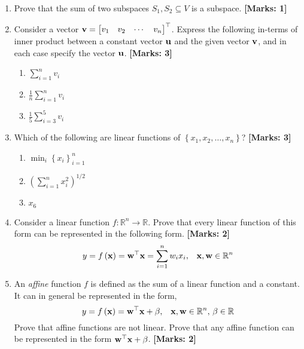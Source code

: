 \documentclass[12pt]{article}
\def\mf{\ensuremath\mathbf}
\begin{document}
\begin{enumerate}
    \item Prove that the sum of two subspaces $S_1, S_2 \subseteq V$ is a subspace. \textbf{[Marks: 1]}
    
    \item Consider a vector $\mf{v} = \begin{bmatrix*}v_1 & v_2 & \cdots & v_n\end{bmatrix*}^\top$. Express the following in-terms of inner product between a constant vector $\mf{u}$ and the given vector $\mf{v}$, and in each case specify the vector $\mf{u}$. \textbf{[Marks: 3]}
    \begin{enumerate}
        \item $\sum_{i=1}^n v_i$
        \item $\frac{1}{n}\sum_{i=1}^n v_i$
        \item $\frac{1}{5}\sum_{i=3}^5 v_i$
    \end{enumerate} 
    
    \item Which of the following are linear functions of $\left\{x_1, x_2, \ldots,x_n\right\}$? \textbf{[Marks: 3]}
    \begin{enumerate}
        \item $\min_i \left\{x_i\right\}_{i=1}^{n}$
        \item $\left(\sum_{i=1}^n x_i^2\right)^{1/2}$
        \item $x_6$
    \end{enumerate}
    
    \item Consider a linear function $f: \mathbb{R}^n \rightarrow \mathbb{R}$. Prove that every linear function of this form can be represented in the following form. \textbf{[Marks: 2]}
    \[ y = f\left(\mf{x}\right) = \mf{w}^\top\mf{x} = \sum_{i=1}^{n}w_ix_i, \,\,\,\,\, \mf{x}, \mf{w} \in \mathbb{R}^n \]

    \item An \textit{affine} function $f$ is defined as the sum of a linear function and a constant. It can in general be represented in the form, 
    \[ y = f\left(\mf{x}\right) = \mf{w}^\top\mf{x} + \beta, \,\,\,\,\, \mf{x}, \mf{w} \in \mathbb{R}^n, \, \beta \in \mathbb{R} \]
    Prove that affine functions are not linear. Prove that any affine function can be represented in the form $\mf{w}^\top\mf{x} + \beta$. \textbf{[Marks: 2]}


\end{enumerate}
\end{document}
